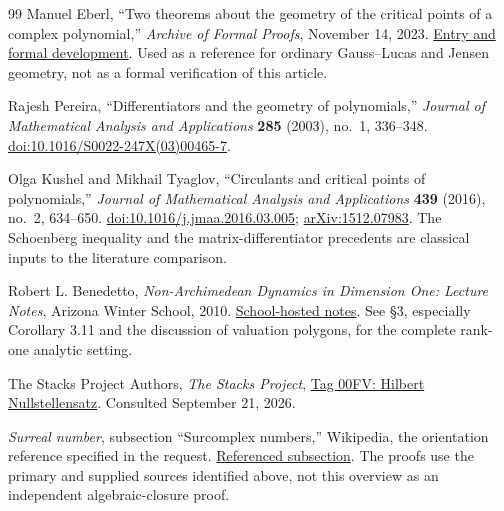 \documentclass[11pt,letterpaper]{article}
\numberwithin{equation}{section}
\theoremstyle{definition}
\theoremstyle{remark}\newtheorem{remark}[theorem]{Remark}
\begin{document}
\begin{thebibliography}{99}
Manuel Eberl, ``Two theorems about the geometry of the critical points of a
complex polynomial,'' \emph{Archive of Formal Proofs}, November 14, 2023.
\href{https://isa-afp.org/entries/Polynomial_Crit_Geometry.html}{Entry and formal development}.
Used as a reference for ordinary Gauss--Lucas and Jensen geometry,
not as a formal verification of this article.

Rajesh Pereira, ``Differentiators and the geometry of polynomials,''
\emph{Journal of Mathematical Analysis and Applications}
\textbf{285} (2003), no.~1, 336--348.
\href{https://doi.org/10.1016/S0022-247X(03)00465-7}{doi:10.1016/S0022-247X(03)00465-7}.

Olga Kushel and Mikhail Tyaglov, ``Circulants and critical points of
polynomials,'' \emph{Journal of Mathematical Analysis and Applications}
\textbf{439} (2016), no.~2, 634--650.
\href{https://doi.org/10.1016/j.jmaa.2016.03.005}{doi:10.1016/j.jmaa.2016.03.005};
\href{https://arxiv.org/abs/1512.07983}{arXiv:1512.07983}.
The Schoenberg inequality and the matrix-differentiator precedents
are classical inputs to the literature comparison.

Robert L. Benedetto, \emph{Non-Archimedean Dynamics in Dimension One:
Lecture Notes}, Arizona Winter School, 2010.
\href{https://swc-math.github.io/aws/2010/2010BenedettoNotes-09Mar.pdf}{School-hosted notes}.
See \S3, especially Corollary 3.11 and the discussion of valuation
polygons, for the complete rank-one analytic setting.

The Stacks Project Authors, \emph{The Stacks Project},
\href{https://stacks.math.columbia.edu/tag/00FV}{Tag 00FV:
Hilbert Nullstellensatz}. Consulted September 21, 2026.

\emph{Surreal number}, subsection ``Surcomplex numbers,''
Wikipedia, the orientation reference specified in the request.
\href{https://en.wikipedia.org/wiki/Surreal_number\#Surcomplex_numbers}{Referenced subsection}.
The proofs use the primary and supplied sources identified above,
not this overview as an independent algebraic-closure proof.
\end{thebibliography}
\end{document}
